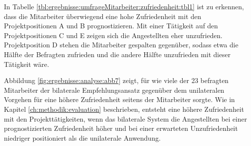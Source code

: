 In Tabelle \ref{tbl:ergebnisse:umfrageMitarbeiter:zufriedenheit:tbl1} ist zu erkennen, dass die Mitarbeiter überwiegend eine hohe Zufriedenheit mit den Projektpositionen A und B prognostizieren. Mit einer Tätigkeit auf den Projektpositionen C und E zeigen sich die Angestellten eher unzufrieden. Projektposition D stehen die Mitarbeiter gespalten gegenüber, sodass etwa die Hälfte der Befragten zufrieden und die andere Hälfte unzufrieden mit dieser Tätigkeit wäre.

Abbildung \ref{fig:ergebnisse:analyse:abb7} zeigt, für wie viele der 23 befragten Mitarbeiter der bilaterale Empfehlungsansatz gegenüber dem unilateralen Vorgehen für eine höhere Zufriedenheit seitens der Mitarbeiter sorgte. Wie in Kapitel \ref{ch:methodik:evaluation} beschrieben, entsteht eine höhere Zufriedenheit mit den Projekttätigkeiten, wenn das bilaterale System die Angestellten bei einer prognostizierten Zufriedenheit höher und bei einer erwarteten Unzufriedenheit niedriger positioniert als die unilaterale Anwendung.

